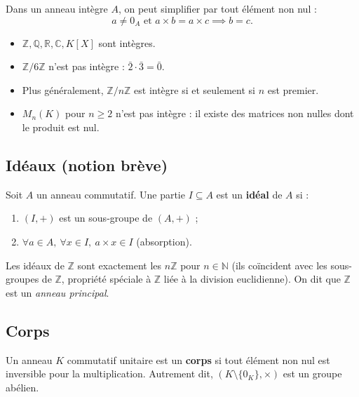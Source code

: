 \begin{proposition}
Dans un anneau intègre $A$, on peut simplifier par tout élément non nul :
\[ a \neq 0_A \text{ et } a \times b = a \times c \implies b = c. \]
\end{proposition}

\begin{exemple}
\begin{itemize}
    \item $\mathbb{Z}, \mathbb{Q}, \mathbb{R}, \mathbb{C}, K[X]$ sont intègres.
    \item $\mathbb{Z}/6\mathbb{Z}$ n'est pas intègre : $\bar{2} \cdot \bar{3} = \bar{0}$.
    \item Plus généralement, $\mathbb{Z}/n\mathbb{Z}$ est intègre si et seulement si $n$ est premier.
    \item $M_n(K)$ pour $n \ge 2$ n'est pas intègre : il existe des matrices non nulles dont le produit est nul.
\end{itemize}
\end{exemple}

\subsection{Idéaux (notion brève)}

\begin{definition}[Idéal]
Soit $A$ un anneau commutatif. Une partie $I \subseteq A$ est un \textbf{idéal} de $A$ si :
\begin{enumerate}
    \item $(I, +)$ est un sous-groupe de $(A, +)$ ;
    \item $\forall a \in A,\ \forall x \in I,\ a \times x \in I$ \quad (absorption).
\end{enumerate}
\end{definition}

\begin{exemple}
Les idéaux de $\mathbb{Z}$ sont exactement les $n\mathbb{Z}$ pour $n \in \mathbb{N}$ (ils coïncident avec les sous-groupes de $\mathbb{Z}$, propriété spéciale à $\mathbb{Z}$ liée à la division euclidienne). On dit que $\mathbb{Z}$ est un \emph{anneau principal}.
\end{exemple}

\subsection{Corps}

\begin{definition}[Corps]
Un anneau $K$ commutatif unitaire est un \textbf{corps} si tout élément non nul est inversible pour la multiplication. Autrement dit, $(K \setminus \{0_K\}, \times)$ est un groupe abélien.
\end{definition}


